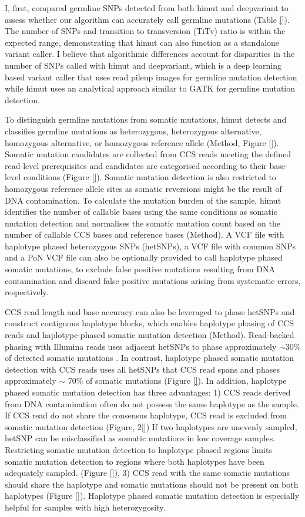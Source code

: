 I, first, compared germline SNPs detected from both himut and deepvariant to assess whether our algorithm can accurately call germline mutations (Table \ref{}). The number of SNPs and transition to transversion (TiTv) ratio is within the expected range, demonstrating that himut can also function as a standalone variant caller. I believe that algorithmic differences account for disparities in the number of SNPs called with himut and deepvariant, which is a deep learning based variant caller that uses read pileup images for germline mutation detection while himut uses an analytical approach similar to GATK for germline mutation detection. 

To distinguish germline mutations from somatic mutations, himut detects and classifies germline mutations as heterozygous, heterozygous alternative, homozygous alternative, or homozygous reference allele (Method, Figure \ref{}). Somatic mutation candidates are collected from CCS reads meeting the defined read-level prerequisites and candidates are categorised according to their base-level conditions (Figure \ref{}). Somatic mutation detection is also restricted to homozygous reference allele sites as somatic reversions might be the result of DNA contamination. To calculate the mutation burden of the sample, himut identifies the number of callable bases using the same conditions as somatic mutation detection and normalises the somatic mutation count based on the number of callable CCS bases and reference bases (Method). A VCF file with haplotype phased heterozygous SNPs (hetSNPs), a VCF file with common SNPs and a PoN VCF file can also be optionally provided to call haplotype phased somatic mutations, to exclude false positive mutations resulting from DNA contamination and discard false positive mutations arising from systematic errors, respectively. 

CCS read length and base accuracy can also be leveraged to phase hetSNPs and construct contiguous haplotype blocks, which enables haplotype phasing of CCS reads and haplotype-phased somatic mutation detection (Method). Read-backed phasing with Illumina reads uses adjacent hetSNPs to phase approximately $\sim$30\% of detected somatic mutations \cite{}. In contrast, haplotype phased somatic mutation detection with CCS reads uses all hetSNPs that CCS read spans and phases approximately $\sim$ 70\% of somatic mutations (Figure \ref{}). In addition, haplotype phased somatic mutation detection has three advantages: 1) CCS reads derived from DNA contamination often do not possess the same haplotype as the sample. If CCS read do not share the consensus haplotype, CCS read is excluded from somatic mutation detection (Figure, 2\ref{}) If two haplotypes are unevenly sampled, hetSNP can be misclassified as somatic mutations in low coverage samples. Restricting somatic mutation detection to haplotype phased regions limits somatic mutation detection to regions where both haplotypes have been adequately sampled. (Figure \ref{}), 3) CCS read with the same somatic mutations should share the haplotype and somatic mutations should not be present on both haplotypes (Figure \ref{}). Haplotype phased somatic mutation detection is especially helpful for samples with high heterozygosity.

